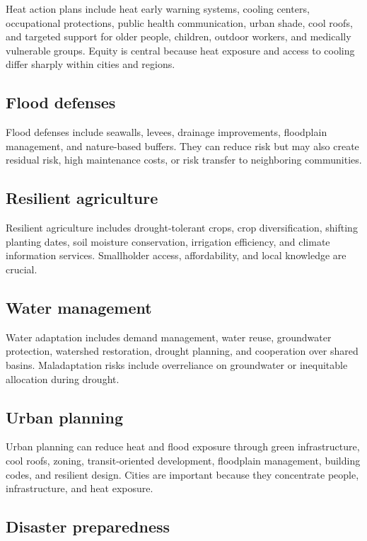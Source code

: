 \documentclass[12pt]{article}
\begin{document}
Heat action plans include heat early warning systems, cooling centers, occupational protections, public health communication, urban shade, cool roofs, and targeted support for older people, children, outdoor workers, and medically vulnerable groups. Equity is central because heat exposure and access to cooling differ sharply within cities and regions.

\subsection{Flood defenses}

Flood defenses include seawalls, levees, drainage improvements, floodplain management, and nature-based buffers. They can reduce risk but may also create residual risk, high maintenance costs, or risk transfer to neighboring communities.

\subsection{Resilient agriculture}

Resilient agriculture includes drought-tolerant crops, crop diversification, shifting planting dates, soil moisture conservation, irrigation efficiency, and climate information services. Smallholder access, affordability, and local knowledge are crucial.

\subsection{Water management}

Water adaptation includes demand management, water reuse, groundwater protection, watershed restoration, drought planning, and cooperation over shared basins. Maladaptation risks include overreliance on groundwater or inequitable allocation during drought.

\subsection{Urban planning}

Urban planning can reduce heat and flood exposure through green infrastructure, cool roofs, zoning, transit-oriented development, floodplain management, building codes, and resilient design. Cities are important because they concentrate people, infrastructure, and heat exposure.

\subsection{Disaster preparedness}
\end{document}

